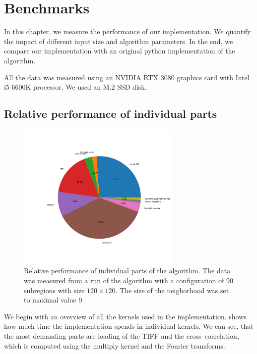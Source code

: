 \chapter{Benchmarks}

In this chapter, we measure the performance of our implementation. We quantify the impact of different input size and algorithm parameters. In the end, we compare our implementation with an original python implementation of the algorithm.

All the data was measured using an NVIDIA RTX 3080 graphics card with Intel i5 6600K processor. We used an M.2 SSD disk.


\section{Relative performance of individual parts}

\begin{figure}
	\centering
	\includegraphics[width=0.7\textwidth]{img/eval/individual-parts}
	\caption{Relative performance of individual parts of the algorithm. The data was measured from a run of the algorithm with a configuration of 90 subregions with size $120 \times 120$. The size of the neigborhood was set to maximal value 9. }
	\label{individual-parts}
\end{figure}

We begin with an overview of all the kernels used in the implementation.  shows how much time the implementation spends in individual kernels. We can see, that the most demanding parts are loading of the TIFF and the cross--correlation, which is computed using the multiply kernel and the Fourier transforms.

